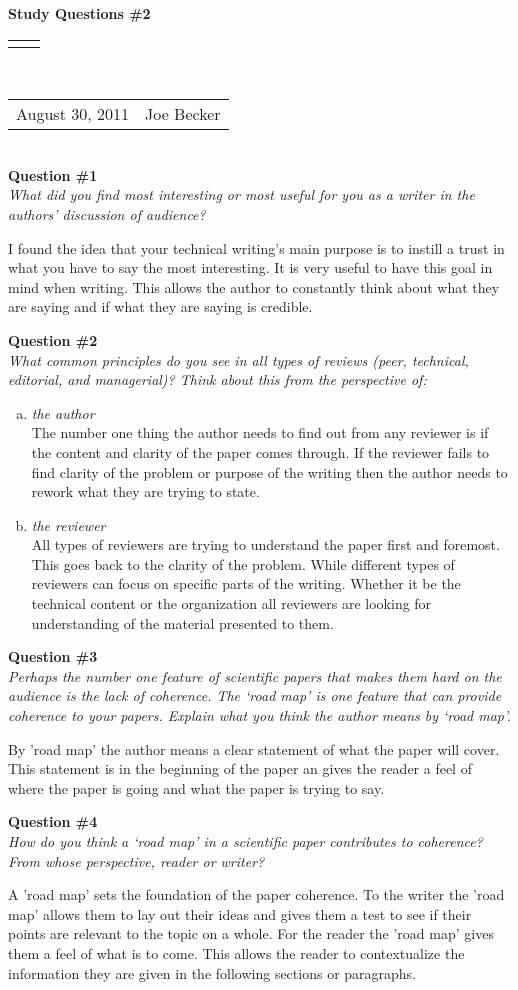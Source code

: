 \documentclass[11pt]{article}
\numberwithin{equation}{section}
\renewcommand{\title}[1]{\textbf{#1}\\}
\renewcommand{\line}{\begin{tabularx}{\textwidth}{X>{\raggedleft}X}\hline\\\end{tabularx}\\[-0.5cm]}
\newcommand{\leftright}[2]{\begin{tabularx}{\textwidth}{X>{\raggedleft}X}#1%
& #2\\\end{tabularx}\\[-0.5cm]}
\begin{document}
\title{Study Questions \#2}
\line
\leftright{August 30, 2011}{Joe Becker} %

\textbf{Question \#1}\\
\indent \textit{\indent What did you find most interesting or most useful for you as a writer in the authors’ discussion of audience?}

I found the idea that your technical writing's main purpose is to instill a trust in what you have to say the most interesting. It is very useful to have this goal in mind when writing. This allows the author to constantly think about what they are saying and if what they are saying is credible.

\textbf{Question \#2}\\
\indent \textit{\indent What common principles do you see in all types of reviews (peer, technical, editorial, and managerial)? Think about this from the perspective of:}
\begin{enumerate}[(a)]
\item \textit{the author}\\
The number one thing the author needs to find out from any reviewer is if the content and clarity of the paper comes through. If the reviewer fails to find clarity of the problem or purpose of the writing then the author needs to rework what they are trying to state.

\item \textit{the reviewer}\\
All types of reviewers are trying to understand the paper first and foremost. This goes back to the clarity of the problem. While different types of reviewers can focus on specific parts of the writing. Whether it be the technical content or the organization all reviewers are looking for understanding of the material presented to them.
\end{enumerate}

\textbf{Question \#3}\\
\indent \textit{\indent Perhaps the number one feature of scientific papers that makes them hard on the audience is the lack of coherence. The ‘road map’ is one feature that can provide coherence to your papers. Explain what you think the author means by ‘road map’.}

By 'road map' the author means a clear statement of what the paper will cover. This statement is in the beginning of the paper an gives the reader a feel of where the paper is going and what the paper is trying to say.

\textbf{Question \#4}\\
\indent \textit{\indent How do you think a ‘road map’ in a scientific paper contributes to coherence? From whose perspective, reader or writer?}

A 'road map' sets the foundation of the paper coherence. To the writer the 'road map' allows them to lay out their ideas and gives them a test to see if their points are relevant to the topic on a whole. For the reader the 'road map' gives them a feel of what is to come. This allows the reader to contextualize the information they are given in the following sections or paragraphs.
\end{document}
